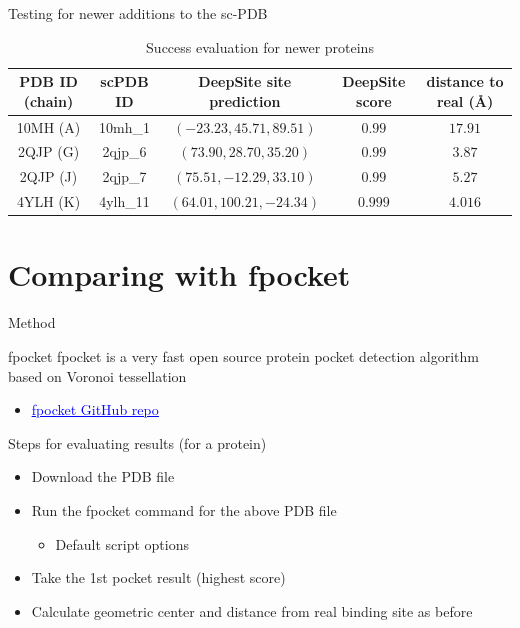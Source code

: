 \documentclass{beamer}
\newcommand{\link}[2]{\href{#1}{\textcolor{blue}{\underline{#2}}}}
\begin{document}
\begin{frame}{Testing for newer additions to the sc-PDB}
  \begin{tiny}
  \begin{table}
  \caption{Success evaluation for newer proteins}
  \label{table:4}
  \begin{tabular}{ c | c | c | c | c }
    PDB ID (chain) & scPDB ID & DeepSite site prediction & DeepSite score & distance to real (\AA) \\
    \hline
    10MH (A) & 10mh\_1 & $(-23.23, 45.71, 89.51)$ & $0.99$ & $17.91$ \\
    2QJP (G) & 2qjp\_6 & $(73.90, 28.70, 35.20)$ & $0.99$ & $3.87$ \\
    2QJP (J) & 2qjp\_7 & $(75.51, -12.29, 33.10)$ & $0.99$ & $5.27$ \\
    4YLH (K) & 4ylh\_11 & $(64.01, 100.21, -24.34)$ & $0.999$ & $4.016$
  \end{tabular}
  \end{table}
  \end{tiny}
\end{frame}

\section{Comparing with fpocket}

\begin{frame}{Method}
  \begin{block}{fpocket}
    fpocket is a very fast open source protein pocket detection algorithm based on Voronoi tessellation
    \begin{itemize}
      \item \link{https://github.com/Discngine/fpocket}{fpocket GitHub repo}
    \end{itemize}
  \end{block}
  \begin{block}{Steps for evaluating results (for a protein)}
    \begin{itemize}
      \item Download the PDB file
      \item Run the fpocket command for the above PDB file
      \begin{itemize}
        \item Default script options
      \end{itemize}
      \item Take the 1st pocket result (highest score)
      \item Calculate geometric center and distance from real binding site as before
    \end{itemize}
  \end{block}
\end{frame}
\end{document}

